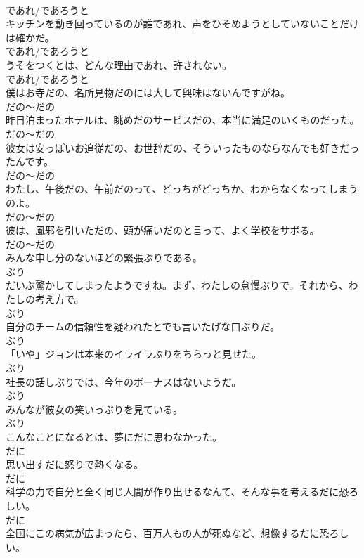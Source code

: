 \documentclass[8pt]{extreport}
\begin{document}
\begin{CJK}{UTF8}{min}
\\	であれ/であろうと
\\	キッチンを動き回っているのが誰であれ、声をひそめようとしていないことだけは確かだ。	
\\	であれ/であろうと
\\	うそをつくとは、どんな理由であれ、許されない。	
\\	であれ/であろうと
\\	僕はお寺だの、名所見物だのには大して興味はないんですがね。	
\\	だの～だの
\\	昨日泊まったホテルは、眺めだのサービスだの、本当に満足のいくものだった。	
\\	だの～だの
\\	彼女は安っぽいお追従だの、お世辞だの、そういったものならなんでも好きだったんです。	
\\	だの～だの
\\	わたし、午後だの、午前だのって、どっちがどっちか、わからなくなってしまうのよ。	
\\	だの～だの
\\	彼は、風邪を引いただの、頭が痛いだのと言って、よく学校をサボる。	
\\	だの～だの
\\	みんな申し分のないほどの緊張ぶりである。	
\\	ぶり
\\	だいぶ驚かしてしまったようですね。まず、わたしの怠慢ぶりで。それから、わたしの考え方で。	
\\	ぶり
\\	自分のチームの信頼性を疑われたとでも言いたげな口ぶりだ。	
\\	ぶり
\\	「いや」ジョンは本来のイライラぶりをちらっと見せた。	
\\	ぶり
\\	社長の話しぶりでは、今年のボーナスはないようだ。	
\\	ぶり
\\	みんなが彼女の笑いっぶりを見ている。	
\\	ぶり
\\	こんなことになるとは、夢にだに思わなかった。	
\\	だに
\\	思い出すだに怒りで熱くなる。	
\\	だに
\\	科学の力で自分と全く同じ人間が作り出せるなんて、そんな事を考えるだに恐ろしい。	
\\	だに
\\	全国にこの病気が広まったら、百万人もの人が死ぬなど、想像するだに恐ろしい。	

\end{CJK}
\end{document}

